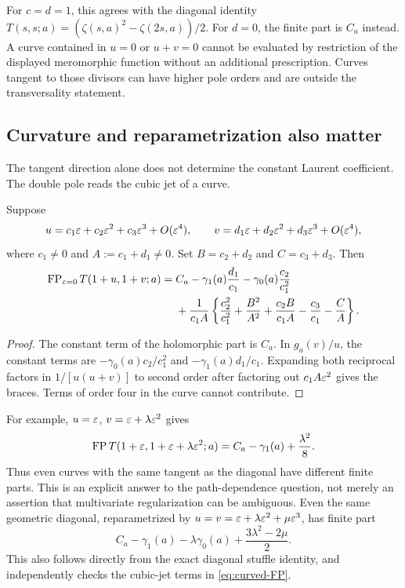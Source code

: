For $c=d=1$, this agrees with the diagonal identity
$T(s,s;a)=(\zeta(s,a)^2-\zeta(2s,a))/2$.
For $d=0$, the finite part is $C_a$ instead. A curve contained in
$u=0$ or $u+v=0$ cannot be evaluated by restriction of the displayed
meromorphic function without an additional prescription. Curves tangent
to those divisors can have higher pole orders and are outside the
transversality statement.

\subsection{Curvature and reparametrization also matter}

The tangent direction alone does not determine the constant Laurent
coefficient. The double pole reads the cubic jet of a curve.

\begin{theorem}
\label{thm:curved}
Suppose
\[
 u=c_1\varepsilon+c_2\varepsilon^2+c_3\varepsilon^3+O(\varepsilon^4),\qquad
 v=d_1\varepsilon+d_2\varepsilon^2+d_3\varepsilon^3+O(\varepsilon^4),
\]
where $c_1\ne0$ and $A:=c_1+d_1\ne0$. Set
$B=c_2+d_2$ and $C=c_3+d_3$. Then
\begin{align}\label{eq:curved-FP}
 \operatorname{FP}_{\varepsilon=0}T(1+u,1+v;a)
 ={}&C_a-\gamma_1(a)\frac{d_1}{c_1}
             -\gamma_0(a)\frac{c_2}{c_1^2}\notag\\
 &+\frac1{c_1A}\left\{
       \frac{c_2^2}{c_1^2}+\frac{B^2}{A^2}
       +\frac{c_2B}{c_1A}-\frac{c_3}{c_1}-\frac CA
                         \right\}.
\end{align}
\end{theorem}
\begin{proof}
The constant term of the holomorphic part is $C_a$. In $g_a(v)/u$,
the constant terms are $-\gamma_0(a)c_2/c_1^2$ and
$-\gamma_1(a)d_1/c_1$. Expanding both reciprocal factors in
$1/[u(u+v)]$ to second order after factoring out $c_1A\varepsilon^2$
gives the braces. Terms of order four in the curve cannot contribute.
\end{proof}

For example, $u=\varepsilon$, $v=\varepsilon+\lambda\varepsilon^2$ gives
\begin{equation}\label{eq:curve-example}
 \operatorname{FP} T(1+\varepsilon,1+\varepsilon+\lambda\varepsilon^2;a)
       =C_a-\gamma_1(a)+\frac{\lambda^2}{8}.
\end{equation}
Thus even curves with the same tangent as the diagonal have different
finite parts. This is an explicit answer to the path-dependence question,
not merely an assertion that multivariate regularization can be ambiguous.
Even the same geometric diagonal, reparametrized by
$u=v=\varepsilon+\lambda\varepsilon^2+\mu\varepsilon^3$, has finite part
\[
 C_a-\gamma_1(a)-\lambda\gamma_0(a)+\frac{3\lambda^2-2\mu}{2}.
\]
This also follows directly from the exact diagonal stuffle identity,
and independently checks the cubic-jet terms in \eqref{eq:curved-FP}.


